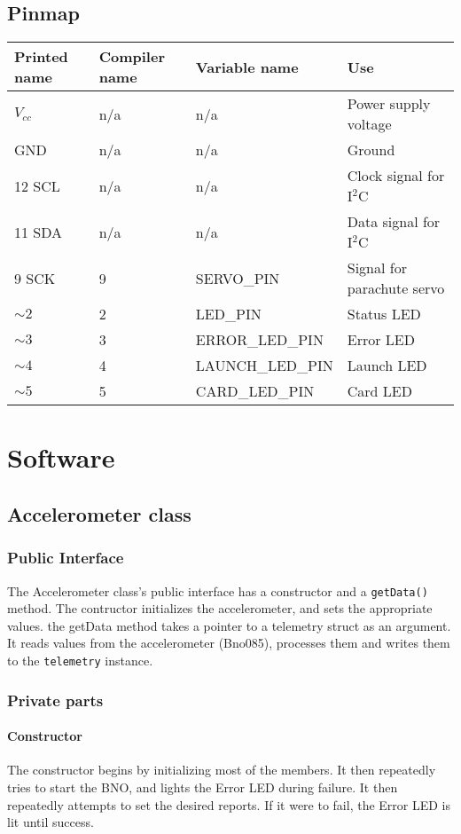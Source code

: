 \documentclass{article}
\begin{document}
\subsection*{Pinmap}
\begin{table}[H]
\begin{tabular}{llll}
Printed name & Compiler name & Variable name & Use \\
\hline
$V_{cc}$ & n/a & n/a & Power supply voltage \\
GND & n/a & n/a & Ground \\
12 SCL & n/a & n/a & Clock signal for I$^2$C \\
11 SDA & n/a & n/a & Data signal for I$^2$C \\
9 SCK & 9 & SERVO\_PIN & Signal for parachute servo \\
$\sim2$ & 2 & LED\_PIN & Status LED \\
$\sim3$ & 3 & ERROR\_LED\_PIN & Error LED \\
$\sim4$ & 4 & LAUNCH\_LED\_PIN & Launch LED \\
$\sim5$ & 5 & CARD\_LED\_PIN & Card LED \\
\end{tabular}
\end{table}

\section*{Software}

\subsection{Accelerometer class}

\subsubsection*{Public Interface}
The Accelerometer class's public interface has a constructor and a \verb|getData()| method. The contructor initializes the accelerometer, and sets the appropriate values.
the getData method takes a pointer to a telemetry struct as an argument. It reads values from the accelerometer (Bno085), processes them and writes them to the \verb|telemetry| instance.

\subsubsection*{Private parts}
\paragraph*{Constructor}
The constructor begins by initializing most of the members. It then repeatedly tries to start the BNO, and lights the Error LED during failure. It then repeatedly attempts
to set the desired reports. If it were to fail, the Error LED is lit until success.
\end{document}
